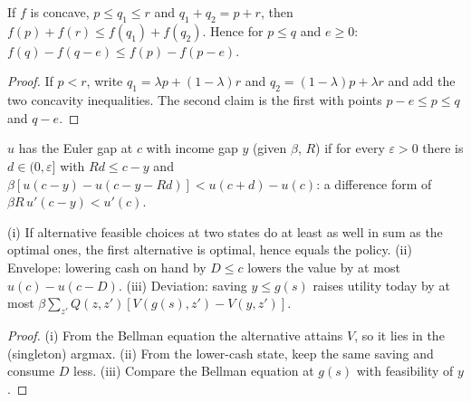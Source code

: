 \begin{lemma}
\label{lem:concave_swap}
\leanok
If $f$ is concave, $p\le q_1\le r$ and $q_1+q_2 = p+r$, then $f(p)+f(r)\le f(q_1)+f(q_2)$. Hence for $p\le q$ and
$e\ge0$: $f(q)-f(q-e)\le f(p)-f(p-e)$.
\end{lemma}
\begin{proof}
\leanok
If $p<r$, write $q_1 = \lambda p + (1-\lambda) r$ and $q_2 = (1-\lambda)p + \lambda r$ and add the two concavity
inequalities. The second claim is the first with points $p-e\le p\le q$ and $q-e$.
\end{proof}

\begin{definition}
\label{def:euler_gap}
\leanok
$u$ has the Euler gap at $c$ with income gap $y$ (given $\beta$, $R$) if for every $\varepsilon>0$ there is
$d\in(0,\varepsilon]$ with $Rd\le c-y$ and $\beta[u(c-y) - u(c-y-Rd)] < u(c+d) - u(c)$: a difference form of
$\beta R\,u'(c-y) < u'(c)$.
\end{definition}

\begin{lemma}
\label{lem:asset_bound_tools}
\leanok
{}
(i) If alternative feasible choices at two states do at least as well in sum as the optimal ones, the first
alternative is optimal, hence equals the policy. (ii) Envelope: lowering cash on hand by $D\le c$ lowers the value by
at most $u(c)-u(c-D)$. (iii) Deviation: saving $y\le g(s)$ raises utility today by at most
$\beta\sum_{z'}Q(z,z')[V(g(s),z') - V(y,z')]$.
\end{lemma}
\begin{proof}
\leanok
(i) From the Bellman equation the alternative attains $V$, so it lies in the (singleton) argmax. (ii) From the
lower-cash state, keep the same saving and consume $D$ less. (iii) Compare the Bellman equation at $g(s)$ with
feasibility of $y$.
\end{proof}

